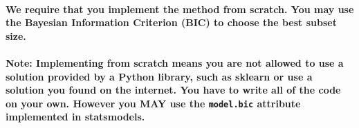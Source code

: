 \documentclass[11pt]{article}
\begin{document}
\paragraph{\texorpdfstring{We require that you implement the method
\textbf{from scratch}. You may use the Bayesian Information Criterion
(BIC) to choose the best subset
size.}{We require that you implement the method from scratch. You may use the Bayesian Information Criterion (BIC) to choose the best subset size.}}\label{we-require-that-you-implement-the-method-from-scratch.-you-may-use-the-bayesian-information-criterion-bic-to-choose-the-best-subset-size.}

\paragraph{\texorpdfstring{Note: Implementing from scratch means you are
not allowed to use a solution provided by a Python library, such as
sklearn or use a solution you found on the internet. You have to write
all of the code on your own. However you MAY use the \texttt{model.bic}
attribute implemented in
statsmodels.}{Note: Implementing from scratch means you are not allowed to use a solution provided by a Python library, such as sklearn or use a solution you found on the internet. You have to write all of the code on your own. However you MAY use the model.bic attribute implemented in statsmodels.}}\label{note-implementing-from-scratch-means-you-are-not-allowed-to-use-a-solution-provided-by-a-python-library-such-as-sklearn-or-use-a-solution-you-found-on-the-internet.-you-have-to-write-all-of-the-code-on-your-own.-however-you-may-use-the-model.bic-attribute-implemented-in-statsmodels.}
\end{document}
